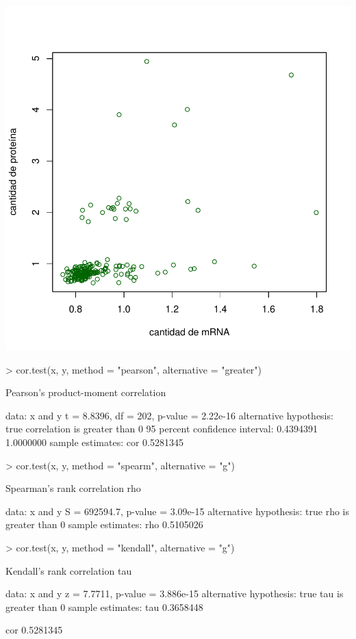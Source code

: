 \documentclass[12pt]{article}
\begin{document}
\includegraphics{ensayo-026}
\begin{Schunk}
\begin{Sinput}
> cor.test(x, y, method = "pearson", alternative = "greater")
\end{Sinput}
\begin{Soutput}
	Pearson's product-moment correlation

data:  x and y
t = 8.8396, df = 202, p-value = 2.22e-16
alternative hypothesis: true correlation is greater than 0
95 percent confidence interval:
 0.4394391 1.0000000
sample estimates:
      cor 
0.5281345 
\end{Soutput}
\begin{Sinput}
> cor.test(x, y, method = "spearm", alternative = "g")
\end{Sinput}
\begin{Soutput}
	Spearman's rank correlation rho

data:  x and y
S = 692594.7, p-value = 3.09e-15
alternative hypothesis: true rho is greater than 0
sample estimates:
      rho 
0.5105026 
\end{Soutput}
\begin{Sinput}
> cor.test(x, y, method = "kendall", alternative = "g")
\end{Sinput}
\begin{Soutput}
	Kendall's rank correlation tau

data:  x and y
z = 7.7711, p-value = 3.886e-15
alternative hypothesis: true tau is greater than 0
sample estimates:
      tau 
0.3658448 
\end{Soutput}
\begin{Soutput}
      cor 
0.5281345 
\end{Soutput}
\end{Schunk}
\end{document}
